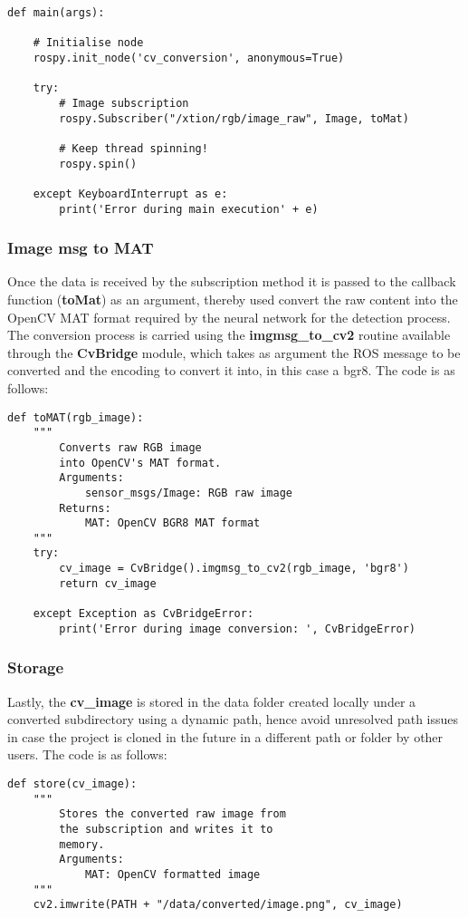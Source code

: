 \begin{lstlisting}
def main(args):

    # Initialise node
    rospy.init_node('cv_conversion', anonymous=True)

    try:
        # Image subscription
        rospy.Subscriber("/xtion/rgb/image_raw", Image, toMat)

        # Keep thread spinning!
        rospy.spin()

    except KeyboardInterrupt as e:
        print('Error during main execution' + e)
\end{lstlisting}

\subsubsection{Image msg to MAT}

Once the data is received by the subscription method it is passed to the callback function (\textbf{toMat}) as an argument, thereby used convert the raw content into the OpenCV MAT format required by the neural network for the detection process. The conversion process is carried using the \textbf{imgmsg\_to\_cv2} routine available through the \textbf{CvBridge} module, which takes as argument the ROS message to be converted and the encoding to convert it into, in this case a bgr8. The code is as follows:

\begin{lstlisting}
def toMAT(rgb_image):
    """
        Converts raw RGB image
        into OpenCV's MAT format.
        Arguments:
            sensor_msgs/Image: RGB raw image
        Returns:
            MAT: OpenCV BGR8 MAT format
    """
    try:
        cv_image = CvBridge().imgmsg_to_cv2(rgb_image, 'bgr8')
        return cv_image

    except Exception as CvBridgeError:
        print('Error during image conversion: ', CvBridgeError)
\end{lstlisting}

\subsubsection{Storage}

Lastly, the \textbf{cv\_image} is stored in the data folder created locally under a converted subdirectory using a dynamic path, hence avoid unresolved path issues in case the project is cloned in the future in a different path or folder by other users. The code is as follows:

\begin{lstlisting}
def store(cv_image):
    """
        Stores the converted raw image from
        the subscription and writes it to
        memory.
        Arguments:
            MAT: OpenCV formatted image
    """
    cv2.imwrite(PATH + "/data/converted/image.png", cv_image)
\end{lstlisting}

